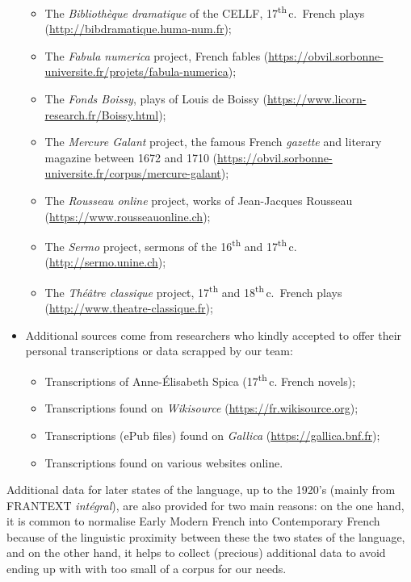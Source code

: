 \begin{itemize}
\begin{itemize}
              \item The \emph{Bibliothèque dramatique} of the CELLF, 17\textsuperscript{th}\,c.~French plays (\url{http://bibdramatique.huma-num.fr});
              \item The \emph{Fabula numerica} project, French fables (\url{https://obvil.sorbonne-universite.fr/projets/fabula-numerica});
              \item The \emph{ Fonds Boissy}, plays of Louis de Boissy (\url{https://www.licorn-research.fr/Boissy.html});
              \item The \emph{Mercure Galant} project, the famous French \emph{gazette} and literary magazine between 1672 and 1710 (\url{https://obvil.sorbonne-universite.fr/corpus/mercure-galant});
              \item The \emph{Rousseau online} project, works of Jean-Jacques Rousseau (\url{https://www.rousseauonline.ch});
              \item The \emph{Sermo} project, sermons of the 16\textsuperscript{th} and 17\textsuperscript{th}\,c. (\url{http://sermo.unine.ch});
              \item The \emph{Théâtre classique} project, 17\textsuperscript{th} and 18\textsuperscript{th}\,c.~French plays (\url{http://www.theatre-classique.fr});
          \end{itemize}
    \item Additional sources come from researchers who kindly accepted to offer their personal transcriptions or data scrapped by our team:
          \begin{itemize}
              \item Transcriptions of Anne-Élisabeth Spica (17\textsuperscript{th}\,c. French novels);
              \item Transcriptions found on \emph{Wikisource} (\url{https://fr.wikisource.org});
              \item Transcriptions (ePub files) found on \emph{Gallica} (\url{https://gallica.bnf.fr});
              \item Transcriptions found on various websites online.
          \end{itemize}
\end{itemize}

Additional data for later states of the language, up to the 1920's (mainly from FRANTEXT \emph{intégral}), are also provided for two main reasons: on the one hand, it is common to normalise Early Modern French into Contemporary French \cite{gabay-2014-pourquoi} because of the linguistic proximity between these the two states of the language, and on the other hand, it helps to collect (precious) additional data to avoid ending up with with too small of a corpus for our needs.

